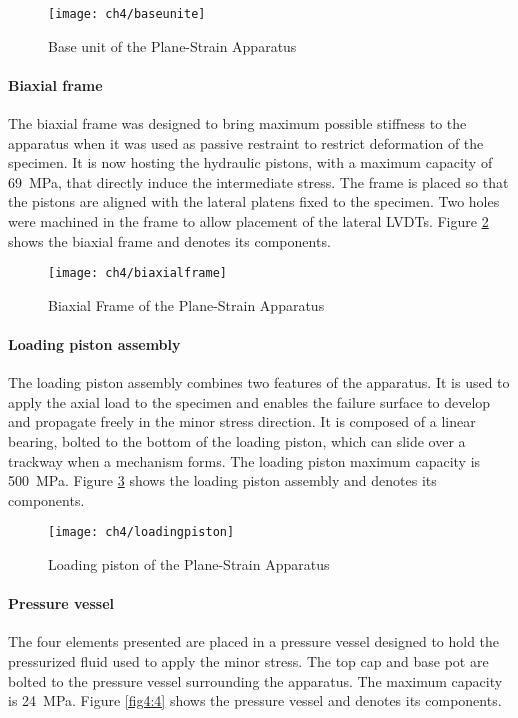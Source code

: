\begin{figure}[p]
    \centering
    \texttt{[image: ch4/baseunite]}
    \caption{Base unit of the Plane-Strain Apparatus}
    \label{fig4:1}
\end{figure} 

\paragraph{Biaxial frame}
The biaxial frame was designed to bring maximum possible stiffness to the apparatus when it was used as passive restraint to restrict deformation of the specimen. It is now hosting the hydraulic pistons, with a maximum capacity of \SI{69}{MPa}, that directly induce the intermediate stress. The frame is placed so that the pistons are aligned with the lateral platens fixed to the specimen. Two holes were machined in the frame to allow placement of the lateral LVDTs. Figure \ref{fig4:2} shows the biaxial frame and denotes its components. 


\begin{figure}[p]
    \centering
    \texttt{[image: ch4/biaxialframe]}
    \caption{Biaxial Frame of the Plane-Strain Apparatus}
    \label{fig4:2}
\end{figure} 

\paragraph{Loading piston assembly} 
The loading piston assembly combines two features of the apparatus. It is used to apply the axial load to the specimen and enables the failure surface to develop and propagate freely in the minor stress direction. It is composed of a linear bearing, bolted to the bottom of the loading piston, which can slide over a trackway when a mechanism forms. The loading piston maximum capacity is \SI{500}{MPa}. Figure \ref{fig4:3} shows the loading piston assembly and denotes its components.


\begin{figure}[p]
    \centering
    \texttt{[image: ch4/loadingpiston]}
    \caption{Loading piston of the Plane-Strain Apparatus}
    \label{fig4:3}
\end{figure} 

\paragraph{Pressure vessel} The four elements presented are placed in a pressure vessel designed to hold the pressurized fluid used to apply the minor stress. The top cap and base pot are bolted to the pressure vessel surrounding the apparatus. The maximum capacity is \SI{24}{MPa}. Figure \ref{fig4:4} shows the pressure vessel and denotes its components.


